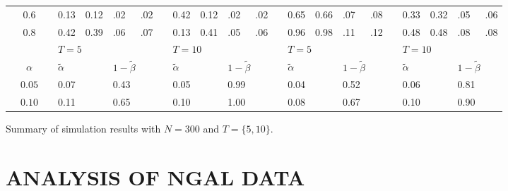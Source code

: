 \documentclass[12pt]{article}
\begin{document}
\begin{sidewaystable}
\begin{tabular}{cc
m{0.01cm}m{0.45cm}m{0.45cm}m{0.2cm}m{0.2cm}
m{0.01cm}m{0.45cm}m{0.45cm}m{0.2cm}m{0.2cm}
m{0.01cm}m{0.45cm}m{0.45cm}m{0.2cm}m{0.2cm}
m{0.01cm}m{0.45cm}m{0.45cm}m{0.2cm}m{0.2cm}
}
& $0.6$ && 0.13 & 0.12 & .02 & .02	&& 0.42 & 0.12 & .02 & .02	&& 0.65 & 0.66 & .07 & .08	&& 0.33 & 0.32 & .05 & .06\\
& $0.8$ && 0.42 & 0.39 & .06 & .07	&& 0.13 & 0.41 & .05 & .06	&& 0.96 & 0.98 & .11 & .12	&& 0.48 & 0.48 & .08 & .08\\
\hline
\hline
\cline{4-12}\cline{14-22}
&&& \multicolumn{4}{l}{$T = 5$} && \multicolumn{4}{l}{$T = 10$} && \multicolumn{4}{l}{$T = 5$} && \multicolumn{4}{l}{$T = 10$}\\
\cline{4-7}\cline{9-12}\cline{14-17}\cline{19-22}
& $\alpha$ &&  
	$\tilde{\alpha}$& &   \multicolumn{2}{l}{$1 - \tilde{\beta}$} &&
	$\tilde{\alpha}$& &   \multicolumn{2}{l}{$1 - \tilde{\beta}$} &&
	$\tilde{\alpha}$& &   \multicolumn{2}{l}{$1 - \tilde{\beta}$} &&
	$\tilde{\alpha}$& &   \multicolumn{2}{l}{$1 - \tilde{\beta}$}\\
& $0.05$ && 0.07 && 0.43 &&& 0.05 && 0.99 &&& 0.04 && 0.52 &&& 0.06 && 0.81\\
& $0.10$ && 0.11 && 0.65 &&& 0.10 && 1.00 &&& 0.08 && 0.67 &&& 0.10 && 0.90\\
\hline
\hline
\end{tabular}
\footnotesize\center
Summary of simulation results with $N = 300$ and $T = \{5, 10\}$. 
\end{sidewaystable}


\clearpage
\section{ANALYSIS OF NGAL DATA}\label{sec:app}
\end{document}

